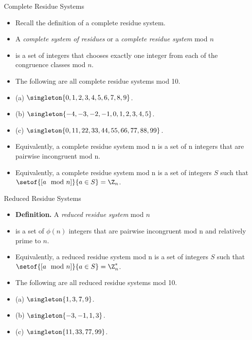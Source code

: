 \documentclass{beamer}
\begin{document}
\begin{frame}{Complete Residue Systems}
\begin{itemize}
\item Recall the definition of a complete residue system.
\item  A \emph{complete system of residues}  or a \emph{complete residue system} mod $n$
\item is a set of integers that
chooses exactly one integer from each of the congruence classes mod $n$.
\item The following are all complete residue systems mod 10.
\item (a) $\singleton{0,1,2,3,4,5,6,7,8,9}$.
\item (b) $\singleton{-4,-3,-2,-1,0,1,2,3,4,5}$.
\item (c) $\singleton{0,11,22,33,44,55,66,77,88,99}$.
\item Equivalently, a complete residue system mod n is a set of n integers that
are pairwise incongruent mod n.
\item Equivalently, a complete residue system mod n is a set of integers $S$ such
that $\setof{[a \mod n]}{a\in S} = \Z_n$.
\end{itemize}
\end{frame}

\begin{frame}{Reduced Residue Systems}
\begin{itemize}
\item \textbf{Definition.} A \emph{reduced residue system} mod $n$
\item is a set of $\phi(n)$ integers that are pairwise incongruent mod n and
relatively prime to $n$.
\item Equivalently, a reduced residue system mod n is a set of integers $S$ such
that $\setof{[a \mod n]}{a\in S} = \Z_n^*$.
\item The following are all reduced residue systems mod 10.
\item (a) $\singleton{1,3,7,9}$.
\item (b) $\singleton{-3,-1,1,3}$.
\item (c) $\singleton{11,33,77,99}$.
\end{itemize}
\end{frame}
\end{document}
